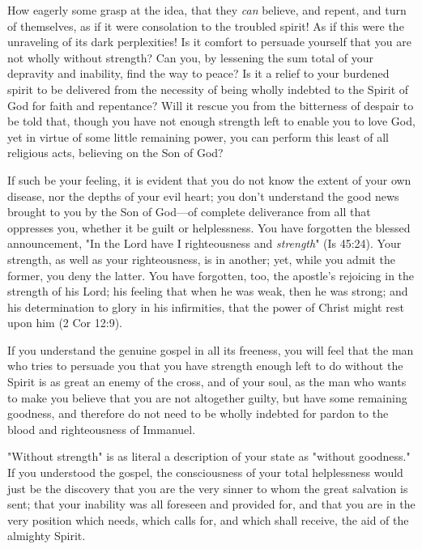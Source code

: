 \documentclass[
]{book}
\begin{document}
How eagerly some grasp at the idea, that they \emph{can} believe, and repent, and turn of themselves, as if it were consolation to the troubled spirit! As if this were the unraveling of its dark perplexities! Is it comfort to persuade yourself that you are not wholly without strength? Can you, by lessening the sum total of your depravity and inability, find the way to peace? Is it a relief to your burdened spirit to be delivered from the necessity of being wholly indebted to the Spirit of God for faith and repentance? Will it rescue you from the bitterness of despair to be told that, though you have not enough strength left to enable you to love God, yet in virtue of some little remaining power, you can perform this least of all religious acts, believing on the Son of God?

If such be your feeling, it is evident that you do not know the extent of your own disease, nor the depths of your evil heart; you don't understand the good news brought to you by the Son of God---of complete deliverance from all that oppresses you, whether it be guilt or helplessness. You have forgotten the blessed announcement, "In the Lord have I righteousness and \emph{strength}" (Is 45:24). Your strength, as well as your righteousness, is in another; yet, while you admit the former, you deny the latter. You have forgotten, too, the apostle's rejoicing in the strength of his Lord; his feeling that when he was weak, then he was strong; and his determination to glory in his infirmities, that the power of Christ might rest upon him (2 Cor 12:9).

If you understand the genuine gospel in all its freeness, you will feel that the man who tries to persuade you that you have strength enough left to do without the Spirit is as great an enemy of the cross, and of your soul, as the man who wants to make you believe that you are not altogether guilty, but have some remaining goodness, and therefore do not need to be wholly indebted for pardon to the blood and righteousness of Immanuel.

"Without strength" is as literal a description of your state as "without goodness." If you understood the gospel, the consciousness of your total helplessness would just be the discovery that you are the very sinner to whom the great salvation is sent; that your inability was all foreseen and provided for, and that you are in the very position which needs, which calls for, and which shall receive, the aid of the almighty Spirit.
\end{document}
